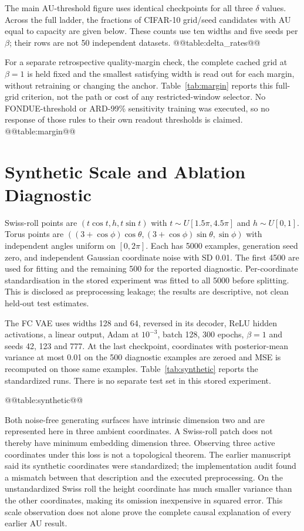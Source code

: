 The main AU-threshold figure uses identical checkpoints for all three
$\delta$ values. Across the full ladder, the fractions of CIFAR-10
grid/seed candidates with AU equal to capacity are given below.
These counts use ten widths and five seeds per $\beta$; their rows are
not 50 independent datasets.
@@table:delta_rates@@

For a separate retrospective quality-margin check, the complete cached
grid at $\beta=1$ is held fixed and the smallest satisfying width is read
out for each margin, without retraining or changing the anchor.
Table~\ref{tab:margin} reports this full-grid criterion, not the path or
cost of any restricted-window selector. No FONDUE-threshold or ARD-99\%
sensitivity training was executed, so no response of those rules to their
own readout thresholds is claimed.
@@table:margin@@

\section{Synthetic Scale and Ablation Diagnostic}\label{app:synthetic}
Swiss-roll points are $(t\cos t,h,t\sin t)$ with
$t\sim U[1.5\pi,4.5\pi]$ and $h\sim U[0,1]$. Torus points are
$((3+\cos\phi)\cos\theta,(3+\cos\phi)\sin\theta,\sin\phi)$ with
independent angles uniform on $[0,2\pi]$. Each has 5000 examples,
generation seed zero, and independent Gaussian coordinate noise with
SD 0.01. The first 4500 are used for fitting and the remaining 500 for
the reported diagnostic. Per-coordinate standardisation in the stored
experiment was fitted to all 5000 before splitting. This is disclosed
as preprocessing leakage; the results are descriptive, not clean
held-out test estimates.

The FC VAE uses widths 128 and 64, reversed in its decoder, ReLU hidden
activations, a linear output, Adam at $10^{-3}$, batch 128, 300 epochs,
$\beta=1$ and seeds 42, 123 and 777. At the last checkpoint, coordinates
with posterior-mean variance at most 0.01 on the 500 diagnostic examples
are zeroed and MSE is recomputed on those same examples.
Table~\ref{tab:synthetic} reports the standardized runs. There is no
separate test set in this stored experiment.

@@table:synthetic@@

Both noise-free generating surfaces have intrinsic dimension two and
are represented here in three ambient coordinates. A Swiss-roll patch
does not thereby have minimum embedding dimension three. Observing
three active coordinates under this loss is not a topological theorem.
The earlier manuscript said its synthetic coordinates were standardized;
the implementation audit found a mismatch between that description and
the executed preprocessing. On the unstandardized Swiss roll the height
coordinate has much smaller variance than the other coordinates, making
its omission inexpensive in squared error. This scale observation does
not alone prove the complete causal explanation of every earlier AU
result.

